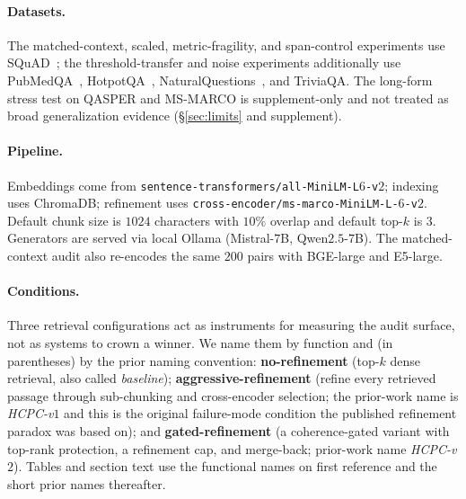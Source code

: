 \paragraph{Datasets.} The matched-context, scaled, metric-fragility,
and span-control experiments use SQuAD~\citep{rajpurkar2016squad}; the
threshold-transfer and noise experiments additionally use
PubMedQA~\citep{jin2019pubmedqa}, HotpotQA~\citep{yang2018hotpotqa},
NaturalQuestions~\citep{kwiatkowski2019nq}, and TriviaQA. The long-form
stress test on QASPER and MS-MARCO is supplement-only and not treated
as broad generalization evidence (\S\ref{sec:limits} and supplement).

\paragraph{Pipeline.} Embeddings come from
\texttt{sentence-transformers/all-MiniLM-L$6$-v$2$}; indexing uses
ChromaDB; refinement uses
\texttt{cross-encoder/ms-marco-MiniLM-L-$6$-v$2$}. Default chunk size is
$1024$ characters with $10\%$ overlap and default top-$k$ is $3$.
Generators are served via local Ollama (Mistral-$7$B,
Qwen$2.5$-$7$B). The matched-context audit also re-encodes the same
$200$ pairs with BGE-large and E5-large.

\paragraph{Conditions.} Three retrieval configurations act as
instruments for measuring the audit surface, not as systems to crown
a winner. We name them by function and (in parentheses) by the prior
naming convention: \textbf{no-refinement} (top-$k$ dense retrieval,
also called \emph{baseline}); \textbf{aggressive-refinement} (refine
every retrieved passage through sub-chunking and cross-encoder
selection; the prior-work name is \emph{HCPC-v$1$} and this is the
original failure-mode condition the published refinement paradox was
based on); and \textbf{gated-refinement} (a coherence-gated variant
with top-rank protection, a refinement cap, and merge-back; prior-work
name \emph{HCPC-v$2$}). Tables and section text use the functional
names on first reference and the short prior names thereafter.

